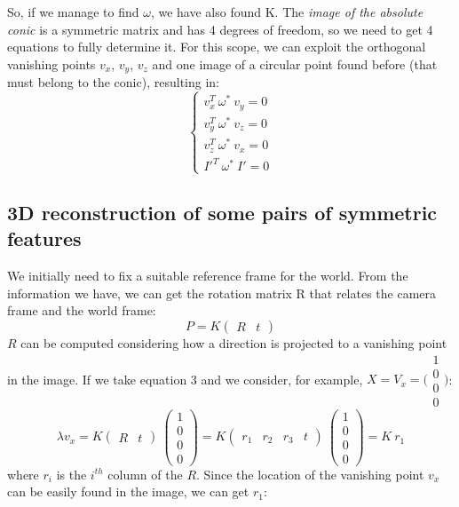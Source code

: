\documentclass{article}
\begin{document}
So, if we manage to find $\omega$, we have also found K. The \textit{image of the absolute conic} is a symmetric matrix and has 4 degrees of freedom, so we need to get 4 equations to fully determine it. For this scope, we can exploit the orthogonal vanishing points $v_x$, $v_y$, $v_z$ and one image of a circular point found before (that must belong to the conic), resulting in:
$$
\begin{cases}
v_x^T \: \omega^* \: v_y = 0 \\
v_y^T \: \omega^* \: v_z = 0 \\
v_z^T \: \omega^* \: v_x = 0 \\
I'^T \: \omega^* \: I' = 0
\end{cases}
$$

\subsection{3D reconstruction of some pairs of symmetric features}
We initially need to fix a suitable reference frame for the world. From the information we have, we can get the rotation matrix R that relates the camera frame and the world frame:
$$ P = K \begin{pmatrix} R & t \end{pmatrix} $$
$R$ can be computed considering how a direction is projected to a vanishing point in the image. If we take equation 3 and we consider, for example, $X = V_x = \bigl(\begin{smallmatrix} 1 \\ 0 \\ 0 \\ 0 \end{smallmatrix} \bigr)$:
$$ \lambda v_x = K \begin{pmatrix} R & t \end{pmatrix} \: \begin{pmatrix} 1 \\ 0 \\ 0 \\ 0 \end{pmatrix} =
K \begin{pmatrix} r_1 & r_2 & r_3 & t \end{pmatrix} \: \begin{pmatrix} 1 \\ 0 \\ 0 \\ 0 \end{pmatrix} = 
K \: r_1
$$
where $r_i$ is the $i^{th}$ column of the $R$.
Since the location of the vanishing point $v_x$ can be easily found in the image, we can get $r_1$:
\end{document}
